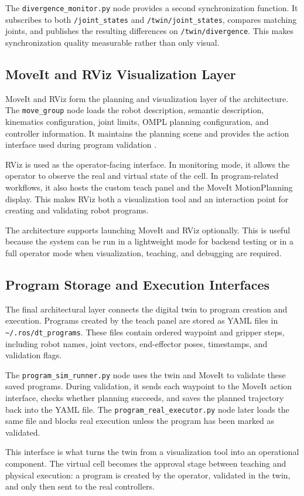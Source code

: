 The \texttt{divergence\_monitor.py} node provides a second synchronization function. It subscribes to both \texttt{/joint\_states} and \texttt{/twin/joint\_states}, compares matching joints, and publishes the resulting differences on \texttt{/twin/divergence}. This makes synchronization quality measurable rather than only visual.

\subsection{MoveIt and RViz Visualization Layer}

MoveIt and RViz form the planning and visualization layer of the architecture. The \texttt{move\_group} node loads the robot description, semantic description, kinematics configuration, joint limits, OMPL planning configuration, and controller information. It maintains the planning scene and provides the action interface used during program validation \cite{coleman2014reducing,görner2019moveit}.

RViz is used as the operator-facing interface. In monitoring mode, it allows the operator to observe the real and virtual state of the cell. In program-related workflows, it also hosts the custom teach panel and the MoveIt MotionPlanning display. This makes RViz both a visualization tool and an interaction point for creating and validating robot programs.

The architecture supports launching MoveIt and RViz optionally. This is useful because the system can be run in a lightweight mode for backend testing or in a full operator mode when visualization, teaching, and debugging are required.

\subsection{Program Storage and Execution Interfaces}

The final architectural layer connects the digital twin to program creation and execution. Programs created by the teach panel are stored as YAML files in \texttt{\textasciitilde/.ros/dt\_programs}. These files contain ordered waypoint and gripper steps, including robot names, joint vectors, end-effector poses, timestamps, and validation flags.

The \texttt{program\_sim\_runner.py} node uses the twin and MoveIt to validate these saved programs. During validation, it sends each waypoint to the MoveIt action interface, checks whether planning succeeds, and saves the planned trajectory back into the YAML file. The \texttt{program\_real\_executor.py} node later loads the same file and blocks real execution unless the program has been marked as validated.

This interface is what turns the twin from a visualization tool into an operational component. The virtual cell becomes the approval stage between teaching and physical execution: a program is created by the operator, validated in the twin, and only then sent to the real controllers.
